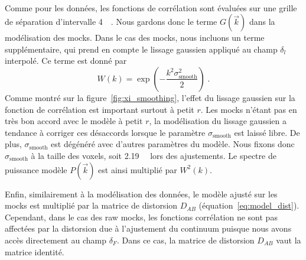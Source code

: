 \paragraph{}
Comme pour les données, les fonctions de corrélation sont évaluées sur une grille de séparation d'intervalle \SI{4}{\perh\Mpc}. Nous gardons donc le terme $G(\vec k)$ dans la modélisation des mocks.
Dans le cas des mocks, nous incluons un terme supplémentaire, qui prend en compte le lissage gaussien appliqué au champ $\delta_l$ interpolé. Ce terme est donné par
\begin{equation}
  W(k) = \exp(- \frac{k^2 \sigma_{\mathrm{smooth}}^2}{2}) \; .
\end{equation}
Comme montré sur la figure~\ref{fig:xi_smoothing}, l'effet du lissage gaussien sur la fonction de corrélation est important surtout à petit $r$. Les mocks n'étant pas en très bon accord avec le modèle à petit $r$, %
  la modélisation du lissage gaussien a tendance à corriger ces désaccords lorsque le paramètre $\sigma_{\mathrm{smooth}}$ est laissé libre.
  De plus, $\sigma_{\mathrm{smooth}}$ est dégénéré avec d'autres paramètres du modèle.
  Nous fixons donc $\sigma_{\mathrm{smooth}}$ à la taille des voxels, soit \SI{2.19}{\perh\Mpc} lors des ajustements.
Le spectre de puissance modèle $P(\vec k)$ est ainsi multiplié par $W^2(k)$.

Enfin, similairement à la modélisation des données, le modèle ajusté sur les mocks est multiplié par la matrice de distorsion $D_{AB}$ (équation~\ref{eq:model_dist}). Cependant, dans le cas des raw mocks, les fonctions corrélation ne sont pas affectées par la distorsion due à l'ajustement du continuum puisque nous avons accès directement au champ $\delta_F$. Dans ce cas, la matrice de distorsion $D_{AB}$ vaut la matrice identité.


